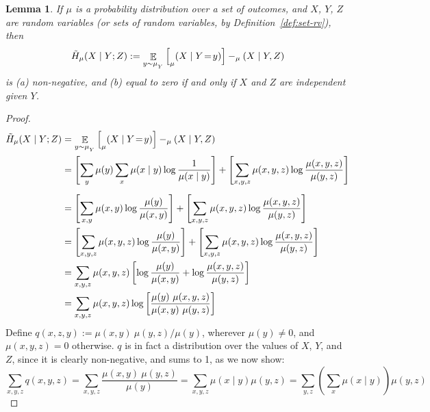 \documentclass{article}
\theoremstyle{plain}
\newtheorem{lemma}[theorem]{Lemma}
\theoremstyle{definition}
\theoremstyle{remark}
\let\H\relax
\DeclareMathOperator{\H}{\mathrm{H}} %
\DeclareMathOperator*{\E}{\mathbb{E}} %
\numberwithin{equation}{section}
\begin{document}
\begin{lemma} \label{lem:bnmaxent-component}
	If $\mu$ is a probability distribution over a set of outcomes, and $X$, $Y$, $Z$ are random variables (or sets of random variables, by Definition~\ref{def:set-rv}), then 
	\[ \tilde H_\mu(X \mid Y; Z) := \E_{y \sim \mu_{_{Y}}} \Big[ \H_\mu(X \mid Y \!=\!y) \Big]  - \H_\mu( X \mid Y, Z)\]
	is (a) non-negative, and (b) equal to zero if and only if $X$ and $Z$ are independent given $Y$.
\end{lemma}
\begin{proof}
	\begin{align*}
		\tilde H_\mu(X \mid Y; Z) &= \E_{y \sim \mu_{_{Y}}}  \Big[ \H_\mu(X \mid Y \!=\!y)\Big] - \H_\mu( X \mid Y, Z)  \\
		&=  \left[\sum_{y} \mu(y) \sum_x  \mu(x\mid y) \log \frac{1}{\mu(x \mid y)} \right]+ \left[\sum_{x,y, z} \mu(x, y, z) \log \frac{\mu(x,y,z)}{\mu(y, z)}\right] \\[0.5em]
		&= \left[\sum_{x,y} \mu(x,y) \log \frac{\mu(y)}{\mu(x,y)}
		\right] + {\left[\sum_{x,y, z} \mu(x, y, z) \log \frac{\mu(x,y,z)}{\mu(y, z)} \right]} \\
		&= \left[\sum_{x,y, z} \mu(x,y ,z) \log \frac{\mu(y)}{\mu(x,y)}
		\right] + {\left[\sum_{x,y, z} \mu(x, y, z) \log \frac{\mu(x,y,z)}{\mu(y, z)} \right]} \\
		&= \sum_{x,y, z} \mu(x,y ,z) \left[ \log \frac{\mu(y)}{\mu(x,y)} + \log \frac{\mu(x,y,z)}{\mu(y, z)} \right] \\
		&= \sum_{x,y, z}  \mu(x,y ,z) \log \left[\frac{\mu(y)\ \mu(x,y,z)}{\mu(x,y)\ \mu(y,z)} \right]  \\
	\end{align*}
	Define $q(x,z,y) := {\mu(x,y)\ \mu(y,z) }/{\mu(y)}$, wherever $\mu(y)\neq 0$, and $\mu(x,y,z) = 0$ otherwise. $q$ is in fact a distribution over the values of $X$, $Y$, and $Z$, since it 
	is clearly non-negative, and sums to 1, as we now show:
	\[
	\sum_{x,y,z} q(x,y, z) = \sum_{x,y,z} \frac{\mu(x,y)\ \mu(y,z)}{\mu(y)}
	= \sum_{x,y,z} \mu(x \mid y) \mu(y,z)
	= \sum_{y,z} \left(\sum_x \mu(x \mid y)\right) \mu(y,z)
\]
\end{proof}
\end{document}
